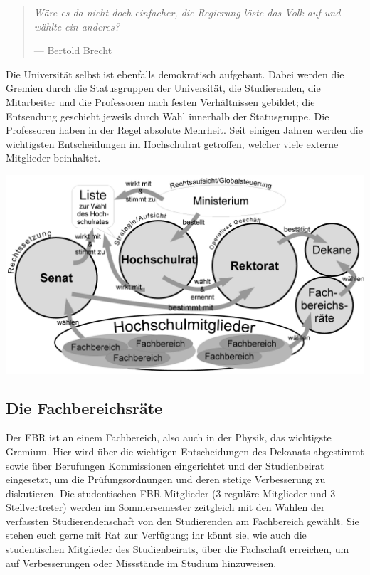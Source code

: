 \begin{multicols*}{2}
\begin{quote}
	\textit{Wäre es da nicht doch einfacher, die Regierung löste das Volk auf und wählte ein anderes?}

	\hfill--- Bertold Brecht
\end{quote}
Die Universität selbst ist ebenfalls demokratisch aufgebaut. Dabei werden die Gremien durch die Statusgruppen der Universität, die Studierenden, die Mitarbeiter und die Professoren nach festen Verhältnissen gebildet; die Entsendung geschieht jeweils durch Wahl innerhalb der Statusgruppe.
Die Professoren haben in der Regel absolute Mehrheit. Seit einigen Jahren werden die wichtigsten Entscheidungen im Hochschulrat getroffen, welcher viele externe Mitglieder beinhaltet.


\includegraphics[width=\columnwidth]{res/uni_strukturen.png}


\subsection{Die Fachbereichsräte}
Der FBR ist an einem Fachbereich, also auch in der Physik, das wichtigste Gremium.
Hier wird über die wichtigen Entscheidungen des Dekanats abgestimmt sowie über Berufungen Kommissionen eingerichtet und der Studienbeirat eingesetzt, um die Prüfungsordnungen und deren stetige Verbesserung zu diskutieren.
Die studentischen FBR-Mitglieder (3 reguläre Mitglieder und 3 Stellvertreter) werden im Sommersemester zeitgleich mit den Wahlen der verfassten Studierendenschaft von den Studierenden am Fachbereich gewählt.
Sie stehen euch gerne mit Rat zur Verfügung; ihr könnt sie, wie auch die studentischen Mitglieder des Studienbeirats, über die Fachschaft erreichen, um auf Verbesserungen oder Missstände im Studium hinzuweisen.



\end{multicols*}
